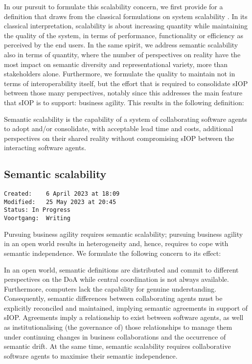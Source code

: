 \documentclass[sort&compress,preprint,3p,authoryear,twocolumn]{elsarticle}
\theoremstyle{break}			%
\begin{document}
In our pursuit to formulate this scalability concern, we first provide
for a definition that draws from the classical formulations on system
scalability \citep{Bondi2000, Steed2010, Shivakumar2015}. In its
classical interpretation, scalability is about increasing quantity while
maintaining the quality of the system, in terms of performance,
functionality or efficiency as perceived by the end users. In the same
spirit, we address semantic scalability also in terms of quantity, where
the number of perspectives on reality have the most impact on semantic
diversity and representational variety, more than stakeholders alone.
Furthermore, we formulate the quality to maintain not in terms of
interoperability itself, but the effort that is required to consolidate
sIOP between those many perspectives, notably since this addresses the
main feature that sIOP is to support: business agility. This results in
the following definition:

\begin{mmdef}\label{def:semantic-scalability}
Semantic scalability is the capability of a system of collaborating software agents to adopt and/or consolidate, with acceptable lead time and costs, additional perspectives on their shared reality without compromising sIOP between the interacting software agents. 
\end{mmdef}

\subsection{Semantic scalability}\label{semantic-scalability}

\begin{verbatim}
Created:    6 April 2023 at 18:09
Modified:   25 May 2023 at 20:45
Status: In Progress
Voortgang:  Writing
\end{verbatim}

Pursuing business agility requires semantic scalability; pursuing
business agility in an open world results in heterogeneity and, hence,
requires to cope with semantic independence. We formulate the following
concern to its effect:

\begin{mmconcern}\label{cncrn:scalability}
  In an open world, semantic definitions are distributed and commit to different perspectives on the DoA while central coordination is not always available. Furthermore, computers lack the capability for genuine understanding. Consequently, semantic differences between collaborating agents must be explicitly reconciled and maintained, implying semantic agreements in support of sIOP. Agreements imply a relationship to exist between software agents, as well as institutionalising (the governance of) those relationships to manage them under continuing changes in business collaborations and the occurrence of semantic drift. At the same time, semantic scalability requires collaborative software agents to maximise their semantic independence.
\end{mmconcern}
\end{document}

